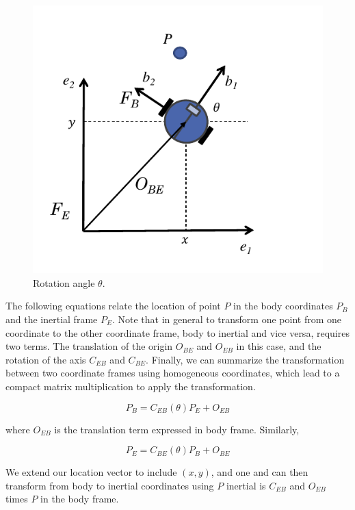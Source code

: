 \begin{figure}[!htb]
\begin{center}
\includegraphics[scale=0.290]{img/coordinate_transforms/robot_orientation.jpeg}
\end{center}
\caption{Rotation angle $\theta$.}
\label{robot_orientation}
\end{figure}

The following equations relate the location of point $P$ in the body coordinates $P_B$ and the inertial frame $P_E$. 
Note that in general to transform one point from one coordinate to the other coordinate frame, body to inertial and vice versa, requires two terms. The translation of the origin $O_{BE}$ and $O_{EB}$ in this case, and the rotation of the axis $C_{EB}$ and $C_{BE}$. Finally, we can summarize the transformation between two coordinate frames using homogeneous coordinates, which lead to a compact matrix multiplication to apply the transformation. 

\begin{equation}
P_B = C_{EB}(\theta)P_E + O_{EB}
\end{equation}

where $O_{EB}$ is the translation term expressed in body frame. Similarly,

\begin{equation}
P_E = C_{BE}(\theta)P_B + O_{BE}
\end{equation}


We extend our location vector to include $(x, y)$, and one and can then transform from body to inertial coordinates using $P$ inertial is $C_{EB}$ and $O_{EB}$ times $P$ in the body frame. 


 
